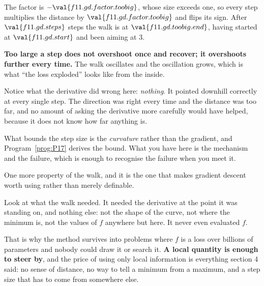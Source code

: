 \begin{fr}
The factor is $-\val{f11.gd.factor.toobig}$, whose size exceeds one, so every
step multiplies the distance by $\val{f11.gd.factor.toobig}$ and flips its
sign. After $\val{f11.gd.steps}$ steps the walk is at
$\val{f11.gd.toobig.end}$, having started at $\val{f11.gd.start}$ and been
aiming at $3$.

\begin{trapbox}
\textbf{Too large a step does not overshoot once and recover; it overshoots
further every time.} The walk oscillates and the oscillation grows, which is
what \enquote{the loss exploded} looks like from the inside.

Notice what the derivative did wrong here: \emph{nothing}. It pointed downhill
correctly at every single step. The direction was right every time and the
distance was too far, and no amount of asking the derivative more carefully
would have helped, because it does not know how far anything is.

What bounds the step size is the \emph{curvature} rather than the gradient,
and Program~\ref{prog:P17} derives the bound. What you have here is the
mechanism and the failure, which is enough to recognise the failure when you
meet it.
\end{trapbox}
\end{fr}

\begin{fr}
One more property of the walk, and it is the one that makes gradient descent
worth using rather than merely definable.

Look at what the walk needed. It needed the derivative at the point it was
standing on, and nothing else: not the shape of the curve, not where the
minimum is, not the values of $f$ anywhere but here. It never even evaluated
$f$.

That is why the method survives into problems where $f$ is a loss over
billions of parameters and nobody could draw it or search it. \textbf{A local
quantity is enough to steer by}, and the price of using only local
information is everything section 4 said: no sense of distance, no way to tell
a minimum from a maximum, and a step size that has to come from somewhere
else.
\end{fr}

